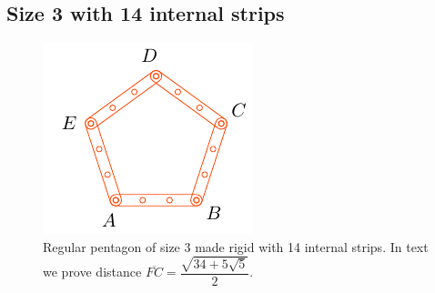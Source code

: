 \documentclass[11pt]{article}
\begin{document}
\subsection{Size 3 with 14 internal strips}

\begin{figure}[H]
\centering
\includegraphics[scale=2]{3/penta3-14a}
\caption{Regular pentagon of size 3 made rigid with 14 internal strips. In text we prove distance $\overline{FC} = \dfrac{\sqrt{34+5\sqrt5}}2$.}
\label{fig:penta3-14a}
\end{figure}
\end{document}
